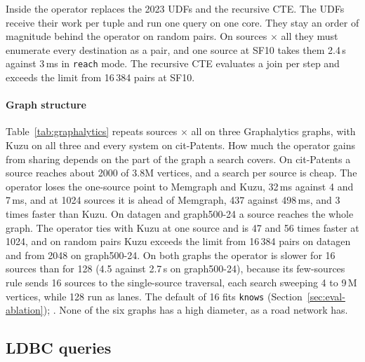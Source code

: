 Inside \duckdb the operator replaces the 2023 UDFs and the recursive CTE. The UDFs receive their work per tuple and run one query on one core. They stay an order of magnitude behind the operator on random pairs. On sources $\times$ all they must enumerate every destination as a pair, and one source at SF10 takes them 2.4\,s against 3\,ms in \texttt{reach} mode. The recursive CTE evaluates a join per
step and exceeds the limit from 16\,384 pairs at SF10.



\paragraph{Graph structure} Table~\ref{tab:graphalytics} repeats sources $\times$ all on three Graphalytics graphs, with Kuzu on all
three and every system on cit-Patents. How much the operator gains from sharing depends on the part of the graph a
search covers. On cit-Patents a source reaches about 2000 of 3.8M vertices, and a search per source is cheap. The
operator loses the one-source point to Memgraph and Kuzu, 32\,ms against 4 and 7\,ms, and at 1024 sources it is ahead of Memgraph, 437 against 498\,ms, and 3 times faster than Kuzu. On datagen and graph500-24 a source reaches the whole graph. The operator ties
with Kuzu at one source and is 47 and 56 times faster at 1024, and on random pairs Kuzu exceeds the limit from 16\,384 pairs on datagen and from 2048 on graph500-24. On both graphs the operator is slower for 16 sources than for 128 (4.5 against 2.7\,s on
graph500-24), because its few-sources rule sends 16 sources to the single-source traversal, each search sweeping 4 to
9\,M vertices, while 128 run as lanes. The default of 16 fits \texttt{knows} (Section~\ref{sec:eval-ablation}); . None of the six graphs has a high diameter, as a road network has.

\subsection{LDBC queries}
\label{sec:eval-ldbc}



